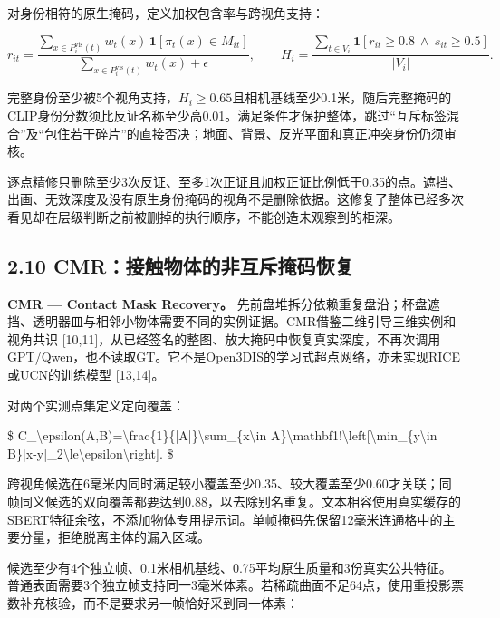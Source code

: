 \documentclass[UTF8,fontset=fandol]{ctexart}
\begin{document}
对身份相符的原生掩码，定义加权包含率与跨视角支持：



\[
r_{it}=\frac{\sum_{x\in P_i^{\mathrm{vis}}(t)}w_t(x)\,\mathbf1[\pi_t(x)\in M_{it}]}{\sum_{x\in P_i^{\mathrm{vis}}(t)}w_t(x)+\epsilon},\qquad
H_i=\frac{\sum_{t\in V_i}\mathbf1[r_{it}\geq0.8\ \land\ s_{it}\geq0.5]}{|V_i|}.
\]

完整身份至少被5个视角支持，$H_i\geq0.65$且相机基线至少0.1米，随后完整掩码的CLIP身份分数须比反证名称至少高0.01。满足条件才保护整体，跳过“互斥标签混合”及“包住若干碎片”的直接否决；地面、背景、反光平面和真正冲突身份仍须审核。



逐点精修只删除至少3次反证、至多1次正证且加权正证比例低于0.35的点。遮挡、出画、无效深度及没有原生身份掩码的视角不是删除依据。这修复了整体已经多次看见却在层级判断之前被删掉的执行顺序，不能创造未观察到的柜深。



\subsection*{2.10 CMR：接触物体的非互斥掩码恢复}

\textbf{CMR — Contact Mask Recovery。} 先前盘堆拆分依赖重复盘沿；杯盘遮挡、透明器皿与相邻小物体需要不同的实例证据。CMR借鉴二维引导三维实例和视角共识 [10,11]，从已经签名的整图、放大掩码中恢复真实深度，不再次调用GPT/Qwen，也不读取GT。它不是Open3DIS的学习式超点网络，亦未实现RICE或UCN的训练模型 [13,14]。



对两个实测点集定义定向覆盖：



\$
C\_\textbackslash{}epsilon(A,B)=\textbackslash{}frac\{1\}\{|A|\}\textbackslash{}sum\_\{x\textbackslash{}in A\}\textbackslash{}mathbf1!\textbackslash{}left[\textbackslash{}min\_\{y\textbackslash{}in B\}|x-y|\_2\textbackslash{}le\textbackslash{}epsilon\textbackslash{}right].
\$



跨视角候选在6毫米内同时满足较小覆盖至少0.35、较大覆盖至少0.60才关联；同帧同义候选的双向覆盖都要达到0.88，以去除别名重复。文本相容使用真实缓存的SBERT特征余弦，不添加物体专用提示词。单帧掩码先保留12毫米连通格中的主要分量，拒绝脱离主体的漏入区域。



候选至少有4个独立帧、0.1米相机基线、0.75平均原生质量和3份真实公共特征。普通表面需要3个独立帧支持同一3毫米体素。若稀疏曲面不足64点，使用重投影票数补充核验，而不是要求另一帧恰好采到同一体素：
\end{document}
